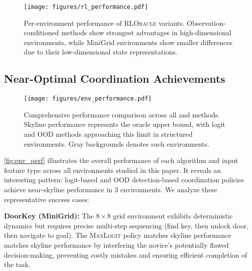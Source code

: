 
\begin{figure}[t]
    \centering
    \texttt{[image: figures/rl\_performance.pdf]}
    \caption{Per-environment performance of \textsc{RLOracle} variants. \colorbox{boxsteelblue}{Observation-conditioned methods} show strongest advantages in high-dimensional environments, while MiniGrid environments show smaller differences due to their low-dimensional state representations.}
    \label{fig:rl_performance}
\end{figure}

\subsection{Near-Optimal Coordination Achievements} \label{app:exp_optimal}

\begin{figure}[t]
\centering
\texttt{[image: figures/env\_performance.pdf]}
\caption{Comprehensive performance comparison across all and methods. \colorbox{boxbrown}{Skyline} performance represents the oracle upper bound, with \colorbox{boxred}{logit} and \colorbox{boxpurple}{OOD} methods approaching this limit in structured environments. Gray backgrounds denotes such environments.}
\label{fig:env_perf}
\end{figure}

\autoref{fig:env_perf} illustrates the overall performance of each algorithm and input feature type across all environments studied in this paper. It reveals an interesting pattern: logit-based and OOD detection-based coordination policies achieve near-skyline performance in $3$ environments. We analyze these representative success cases:

\textbf{DoorKey (MiniGrid):} The $8\times8$ grid environment exhibits deterministic dynamics but requires precise multi-step sequencing (find key, then unlock door, then navigate to goal). The \textsc{MaxLogit} policy matches skyline performance matches skyline performance by interfering the novice's potentially flawed decision-making, preventing costly mistakes and ensuring efficient completion of the task.



